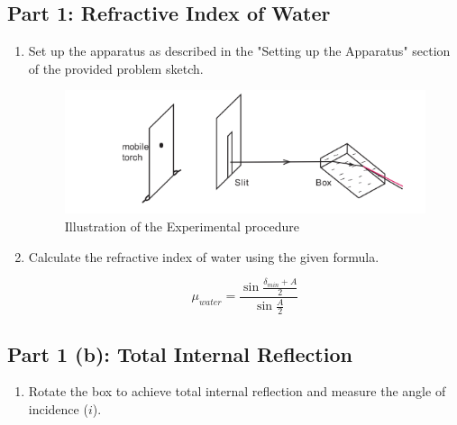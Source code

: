 \documentclass[twocolumn,11pt]{article}
\begin{document}
\subsection{Part 1: Refractive Index of Water}
\begin{enumerate}
    \item Set up the apparatus as described in the "Setting up the Apparatus" section of the provided problem sketch.
    \begin{figure}[H]
        \centering
        \includegraphics[scale =0.5]{deviation_illustration.png}
        \caption{Illustration of the Experimental procedure}
        \label{Illustration of the Experimental procedure}
    \end{figure}
    
    \item Calculate the refractive index of water using the given formula.
    
    \begin{equation}
        \label{Deviationoflight}
        \mu_{water} = \frac{\sin{\frac{\delta_{min} + A}{2}}}{\sin{\frac{A}{2}}} 
    \end{equation}
\end{enumerate}

\subsection{Part 1 (b): Total Internal Reflection}
\begin{enumerate}
    \item Rotate the box to achieve total internal reflection and measure the angle of incidence ($i$).
    
\end{enumerate}
\end{document}
